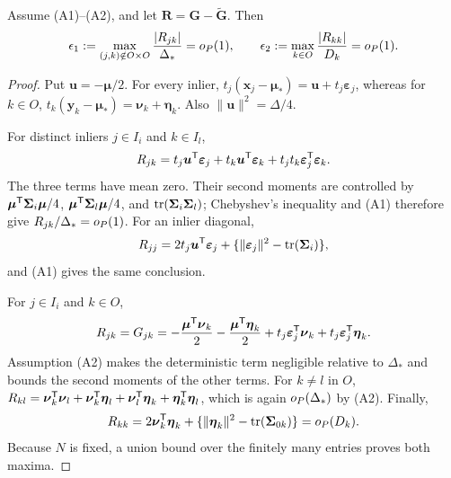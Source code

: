 \begin{lemma}\label{lem:geometry}
Assume (A1)--(A2), and let $\boldsymbol R=\boldsymbol G-\widetilde{\boldsymbol G}$. Then
\[
\epsilon_1:=\max_{(j,k)\notin O\times O}{|R_{jk}|\over\Delta_*}=o_{P}(1),
\qquad
\epsilon_2:=\max_{k\in O}{|R_{kk}|\over D_k}=o_{P}(1).
\]
\end{lemma}
\begin{proof}
Put $\boldsymbol u=-\boldsymbol\mu/2$. For every inlier,
$t_j(\boldsymbol x_j-\boldsymbol\mu_*)=\boldsymbol u+t_j\boldsymbol\varepsilon_j$,
whereas for $k\in O$,
$t_k(\boldsymbol y_k-\boldsymbol\mu_*)=\boldsymbol\nu_k+\boldsymbol\eta_k$.
Also $\lVert\boldsymbol u\rVert^2=\Delta/4$.

For distinct inliers $j\in I_i$ and $k\in I_l$,
\[
R_{jk}=t_j\boldsymbol u^{\mathsf{T}}\boldsymbol\varepsilon_j
+t_k\boldsymbol u^{\mathsf{T}}\boldsymbol\varepsilon_k
+t_jt_k\boldsymbol\varepsilon_j^{\mathsf{T}}\boldsymbol\varepsilon_k.
\]
The three terms have mean zero. Their second moments are controlled by
$\boldsymbol\mu^{\mathsf{T}}\boldsymbol\Sigma_i\boldsymbol\mu/4$,
$\boldsymbol\mu^{\mathsf{T}}\boldsymbol\Sigma_l\boldsymbol\mu/4$, and
$\operatorname{tr}(\boldsymbol\Sigma_i\boldsymbol\Sigma_l)$; Chebyshev's inequality and (A1) therefore give $R_{jk}/\Delta_*=o_{P}(1)$.
For an inlier diagonal,
\[
R_{jj}=2t_j\boldsymbol u^{\mathsf{T}}\boldsymbol\varepsilon_j+
\{\lVert\boldsymbol\varepsilon_j\rVert^2-\operatorname{tr}(\boldsymbol\Sigma_i)\},
\]
and (A1) gives the same conclusion.

For $j\in I_i$ and $k\in O$,
\[
R_{jk}=G_{jk}=-{\boldsymbol\mu^{\mathsf{T}}\boldsymbol\nu_k\over2}
-{\boldsymbol\mu^{\mathsf{T}}\boldsymbol\eta_k\over2}
+t_j\boldsymbol\varepsilon_j^{\mathsf{T}}\boldsymbol\nu_k
+t_j\boldsymbol\varepsilon_j^{\mathsf{T}}\boldsymbol\eta_k.
\]
Assumption (A2) makes the deterministic term negligible relative to $\Delta_*$ and bounds the second moments of the other terms. For $k\ne l$ in $O$,
$R_{kl}=\boldsymbol\nu_k^{\mathsf{T}}\boldsymbol\nu_l+\boldsymbol\nu_k^{\mathsf{T}}\boldsymbol\eta_l+\boldsymbol\nu_l^{\mathsf{T}}\boldsymbol\eta_k+\boldsymbol\eta_k^{\mathsf{T}}\boldsymbol\eta_l$, which is again $o_{P}(\Delta_*)$ by (A2). Finally,
\[
R_{kk}=2\boldsymbol\nu_k^{\mathsf{T}}\boldsymbol\eta_k+
\{\lVert\boldsymbol\eta_k\rVert^2-\operatorname{tr}(\boldsymbol\Sigma_{0k})\}=o_{P}(D_k).
\]
Because $N$ is fixed, a union bound over the finitely many entries proves both maxima.
\end{proof}
